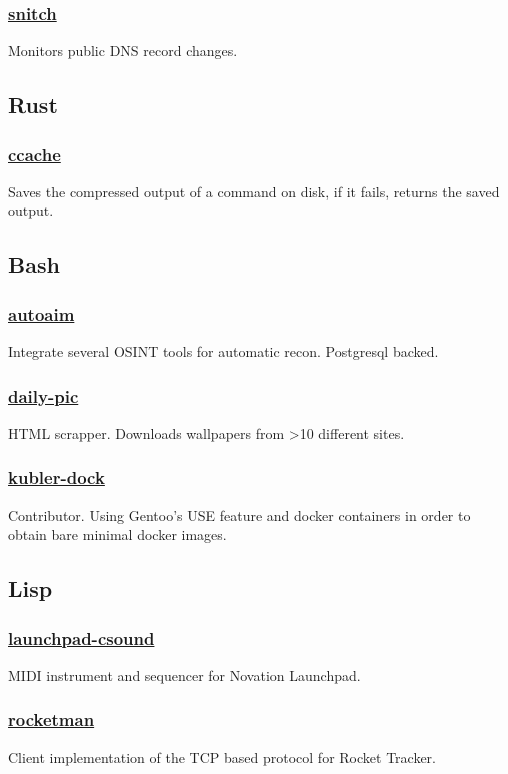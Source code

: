 \documentclass[11pt]{article}
\begin{document}
\subsubsection{\href {https://github.com/azimut/snitch} {snitch}}
Monitors public DNS record changes.

\subsection{Rust}
\subsubsection{\href {https://github.com/azimut/ccache} {ccache}}
Saves the compressed output of a command on disk, if it fails, returns the saved output.

\subsection{Bash}
\subsubsection{\href {https://github.com/azimut/autoaim} {autoaim}}
Integrate several OSINT tools for automatic recon. Postgresql backed.
\subsubsection{\href {https://github.com/azimut/daily-pic} {daily-pic}}
HTML scrapper. Downloads wallpapers from >10 different sites.
\subsubsection{\href {https://github.com/azimut/kubler-dock} {kubler-dock}}
Contributor. Using Gentoo's USE feature and docker containers in order to obtain bare minimal docker images.

\subsection{Lisp}
\subsubsection{\href {https://github.com/azimut/launchpad-csound} {launchpad-csound}}
MIDI instrument and sequencer for Novation Launchpad.
\subsubsection{\href {https://github.com/azimut/rocketman} {rocketman}}
Client implementation of the TCP based protocol for Rocket Tracker.
\end{document}
